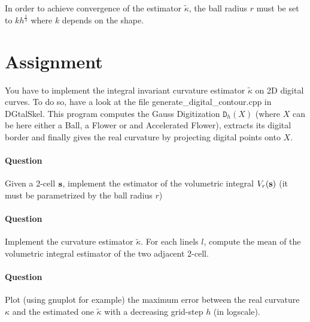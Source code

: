 \documentclass[a4paper, 11pt]{article}
\begin{document}
In order to achieve convergence of the estimator $\tilde{\kappa}$, the ball radius $r$ must be set to $k h^{\frac{1}{3}}$ where $k$ depends on the shape.

\section*{Assignment}

You have to implement the integral invariant curvature estimator $\tilde{\kappa}$ on 2D digital curves. To do so, have a look at the file generate\_digital\_contour.cpp in DGtalSkel.
This program computes the Gauss Digitization $\mathtt{D}_h(X)$ (where $X$ can be here either a Ball, a Flower or and Accelerated Flower), extracts its digital border
and finally gives the real curvature by projecting digital points onto $X$.

\paragraph{Question} Given a 2-cell $\bf{s}$, implement the estimator of the volumetric integral $V_r(\bf{s})$ (it must be parametrized by the ball radius $r$)

\paragraph{Question} Implement the curvature estimator $\tilde{\kappa}$. For each linels $l$, compute the mean of the volumetric integral estimator of the two adjacent 2-cell.

\paragraph{Question} Plot (using gnuplot for example) the maximum error between the real curvature $\kappa$ and the estimated one $\tilde{\kappa}$ with a decreasing grid-step $h$ (in logscale).
\end{document}
